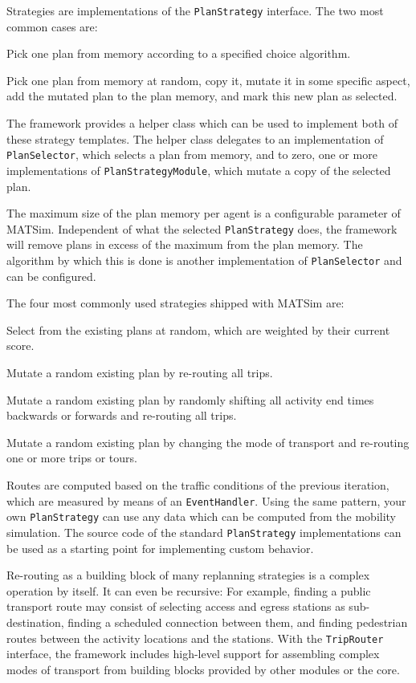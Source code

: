 Strategies are implementations of the \lstinline|PlanStrategy| interface. 
The two most common cases are:
\begin{compactitem}
\item Pick one plan from memory according to a specified choice algorithm.
\item Pick one plan from memory
at random, copy it, mutate it in some specific aspect, add the mutated plan to the plan memory, and
mark this new plan as selected.
\end{compactitem}

The framework provides a helper class which can be used to implement both of these strategy templates. 
The helper class delegates to an implementation of \lstinline|PlanSelector|, which selects a plan from memory, 
and to zero, one or more implementations of \lstinline|PlanStrategyModule|, which mutate a copy of the selected plan.

The maximum size of the plan memory per agent is a configurable parameter of MATSim. Independent
 of what the selected \lstinline|PlanStrategy| does, the framework will remove plans in excess
 of the maximum from the plan memory. The algorithm by which this is done is another implementation
 of \lstinline|PlanSelector| and can be configured. 

The four most commonly used strategies shipped with MATSim are:
\begin{compactitem}
\item Select from the existing plans at random, which are weighted by their current score.
\item Mutate a random existing plan by re-routing all trips.
\item Mutate a random existing plan by randomly shifting all activity end times backwards or forwards and re-routing 
all trips.
\item Mutate a random existing plan by changing the mode of transport and re-routing one or more trips or tours.
\end{compactitem}

Routes are computed based on the traffic conditions of the previous iteration, which are measured
by means of an \lstinline|EventHandler|. Using the same pattern, your own \lstinline|PlanStrategy| can use any data which
can be computed from the mobility simulation. The source code of the standard \lstinline|PlanStrategy| implementations can be 
used as a starting point for implementing custom behavior.

Re-routing as a building block of many replanning strategies is a complex operation by itself. It can
even be recursive: For example, finding a public transport route may consist of selecting access and egress stations as
sub-destination, finding a scheduled connection between them, and finding pedestrian routes between the
activity locations and the stations. With the \lstinline|TripRouter| interface, the framework includes high-level 
support for assembling complex modes of transport from building blocks provided by other modules or the core. 
  
